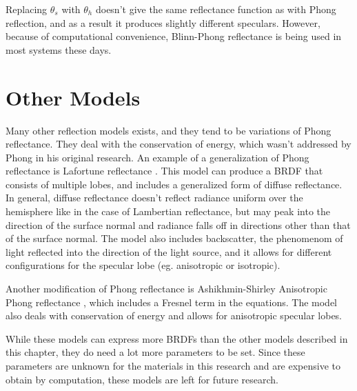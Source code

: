 Replacing $\theta_s$ with $\theta_h$ doesn't give the same reflectance function as with Phong reflection, and as a result it produces slightly different speculars. However, because of computational convenience, Blinn-Phong reflectance is being used in most systems these days.

	\section{Other Models}\label{sec:Other}
		Many other reflection models exists, and they tend to be variations of Phong reflectance. They deal with the conservation of energy, which wasn't addressed by Phong in his original research. An example of a generalization of Phong reflectance is Lafortune reflectance \cite{Lafortune}. This model can produce a BRDF that consists of multiple lobes, and includes a generalized form of diffuse reflectance. In general, diffuse reflectance doesn't reflect radiance uniform over the hemisphere like in the case of Lambertian reflectance, but may peak into the direction of the surface normal and radiance falls off in directions other than that of the surface normal. The model also includes backscatter, the phenomenom of light reflected into the direction of the light source, and it allows for different configurations for the specular lobe (eg. anisotropic or isotropic).

Another modification of Phong reflectance is Ashikhmin-Shirley Anisotropic Phong reflectance \cite{AshikhminShirley}, which includes a Fresnel term in the equations. The model also deals with conservation of energy and allows for anisotropic specular lobes.

While these models can express more BRDFs than the other models described in this chapter, they do need a lot more parameters to be set. Since these parameters are unknown for the materials in this research and are expensive to obtain by computation, these models are left for future research.
